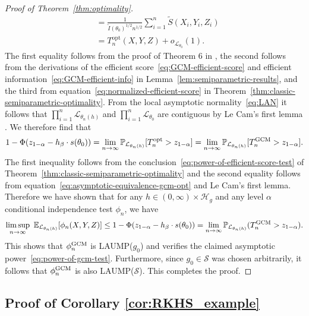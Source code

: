 \documentclass[12pt]{article}
\theoremstyle{definition}
\theoremstyle{remark}
\newcommand{\E}{\mathbb E}								%
\renewcommand{\P}{\mathbb{P}}							%
\newcommand{\srx}{X}									%
\newcommand{\srz}{Z}									%
\newcommand{\sry}{Y}									%
\newcommand{\law}{\mathcal L}							%
\newcommand{\GCM}{\textnormal{GCM}}						%
\renewcommand{\H}{\mathcal H}		 					%
\begin{document}
\begin{proof}[Proof of Theorem~\ref{thm:optimality}]
\begin{equation}
\begin{split}
&= \frac{1}{\widetilde I(\theta_0)^{1/2}n^{1/2}}\sum_{i = 1}^n \widetilde S(\srx_i, \sry_i, \srz_i) \\
&= T_n^{\text{opt}}(\srx, \sry, \srz) + o_{\law_{\theta_0}}(1).
\end{split}
\label{eq:asymptotic-equivalence-gcm-opt}
\end{equation}
The first equality follows from the proof of Theorem 6 in \citet{Shah2018}, the second follows from the derivations of the efficient score~\eqref{eq:GCM-efficient-score} and efficient information~\eqref{eq:GCM-efficient-info} in Lemma~\ref{lem:semiparametric-results}, and the third from equation~\eqref{eq:normalized-efficient-score} in Theorem~\ref{thm:classic-semiparametric-optimality}. From the local asymptotic normality~\eqref{eq:LAN} it follows that $\prod_{i=1}^n\law_{\theta_{n}(h)}$ and $\prod_{i=1}^n\law_{\theta_0}$ are contiguous by Le Cam's first lemma \citep[Example 6.5]{VDV1998}. We therefore find that
\begin{align*}
	1 - \Phi(z_{1-\alpha} - h_\beta \cdot s(\theta_0)) = \lim_{n\rightarrow\infty}\P_{\law_{\theta_{n}(h)}}[T_n^{\text{opt}}>z_{1-\alpha}]=\lim_{n\rightarrow\infty}\P_{\law_{\theta_{n}(h)}}[T_n^{\GCM}>z_{1-\alpha}].
\end{align*}
The first inequality follows from the conclusion~\eqref{eq:power-of-efficient-score-test} of Theorem~\ref{thm:classic-semiparametric-optimality} and the second equality follows from equation~\eqref{eq:asymptotic-equivalence-gcm-opt} and Le Cam's first lemma. Therefore we have shown that for any $h \in (0, \infty) \times \H_g$ and any level $\alpha$ conditional independence test $\phi_n$, we have
\begin{equation*}
\limsup_{n \rightarrow \infty}\ \E_{\law_{\theta_n(h)}}[\phi_n(\srx, \sry, \srz)] \leq 1 - \Phi(z_{1-\alpha} - h_\beta \cdot s(\theta_0)) = \lim_{n\rightarrow\infty}\P_{\law_{\theta_{n}(h)}}(T_n^{\GCM}>z_{1-\alpha}).
\end{equation*}
This shows that $\phi_n^{\GCM}$ is LAUMP($g_0$) and verifies the claimed asymptotic power~\eqref{eq:power-of-gcm-test}. Furthermore, since $g_0 \in \mathcal S$ was chosen arbitrarily, it follows that $\phi_n^{\GCM}$ is also LAUMP($\mathcal S$). This completes the proof.
\end{proof}

\subsection{Proof of Corollary \ref{cor:RKHS_example}} \label{sec:proof-rkhs}
\end{document}
